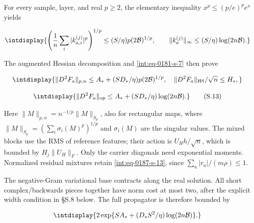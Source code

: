 
For every sample, layer, and real \(p\ge2\), the elementary inequality \(x^p\le(p/e)^pe^x\) yields


\begingroup\renewcommand{\theHequation}{intdisplay.378}
\begin{equation*}
\intdisplay{
\left(\frac1n\sum_i|k_{a,i}^{(j)}|^p\right)^{1/p}
\le (S/\eta)p(2\mathcal B)^{1/p},\qquad
\|k_a^{(j)}\|_\infty\le(S/\eta)\log(2n\mathcal B).
}
\end{equation*}
\endgroup


The augmented Hessian decomposition and \eqref{int:eq-0181-s-7} then prove


\begingroup\renewcommand{\theHequation}{intdisplay.379}
\begin{equation*}
\intdisplay{
\|D^2F_a\|_{p,n}\le A_*+(SD_*/\eta)p(2\mathcal B)^{1/p},
\quad \|D^2F_a\|_{\rm HS}/\sqrt n\le H_*,
}
\end{equation*}
\endgroup

\begingroup\renewcommand{\theHequation}{intdisplay.380}
\begin{equation}
\intdisplay{
\|D^2F_a\|_{\rm op}\le A_*+(SD_*/\eta)\log(2n\mathcal B).
}
\tag{S.13}
\label{int:eq-0187-s-13}
\end{equation}
\endgroup


Here \(\|M\|_{p,\allowbreak n}=n^{-1/p}\|M\|_{S_p}\), also for rectangular maps, where \(\|M\|_{S_p}=(\sum_i\sigma_i(M)^p)^{1/p}\) and \(\sigma_i(M)\) are the singular values. The mixed blocks use the RMS of reference features; their action is \(U_Hh/\sqrt n\), which is bounded by \(H_j\|U_H\|_F\). Only the carrier diagonals need exponential moments. Normalized residual mixtures retain \eqref{int:eq-0187-s-13}, since \(\sum_a|r_a|/(m\rho)\le1\).



The negative-Gram variational base contracts along the real solution. All short complex/backwards pieces together have norm cost at most two, after the explicit width condition in §S.8 below. The full propagator is therefore bounded by


\begingroup\renewcommand{\theHequation}{intdisplay.381}
\begin{equation*}
\intdisplay{
2\exp\{SA_*+(D_*S^2/\eta)\log(2n\mathcal B)\}.
}
\end{equation*}
\endgroup

